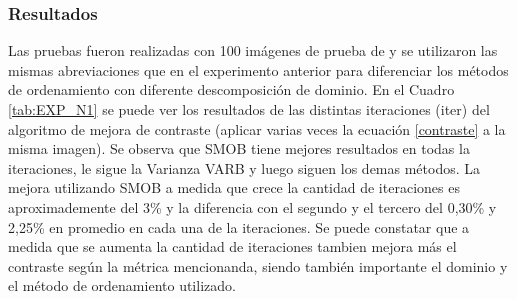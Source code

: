 \subsubsection{Resultados}
 Las pruebas fueron realizadas con 100 im\'agenes de prueba de \cite{arbelaez2007berkeley} y se utilizaron las mismas abreviaciones que en el experimento anterior para diferenciar los métodos de ordenamiento con diferente descomposición de dominio. 
En el Cuadro \ref{tab:EXP_N1} se puede ver los resultados de las distintas iteraciones (iter) del algoritmo de mejora de contraste (aplicar varias veces la ecuación \ref{contraste} a la misma imagen).  
Se observa que SMOB tiene mejores resultados en todas la iteraciones, le sigue la Varianza VARB y luego siguen los demas métodos. La mejora utilizando SMOB a medida que crece la cantidad de iteraciones es aproximademente del 3\% y la diferencia con el segundo y el tercero del 0,30\% y 2,25\% en promedio en cada una de la iteraciones.
Se puede constatar que a medida que se aumenta la cantidad de iteraciones  tambien mejora más el contraste según la métrica mencionanda, siendo también importante el dominio y el método de ordenamiento utilizado.

